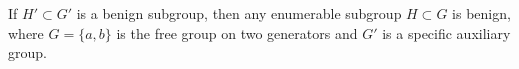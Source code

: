 If $H' \subset G'$ is a benign subgroup, then any enumerable subgroup $H \subset G$ is benign, where $G = \{a, b\}$ is the free group on two generators and $G'$ is a specific auxiliary group.
